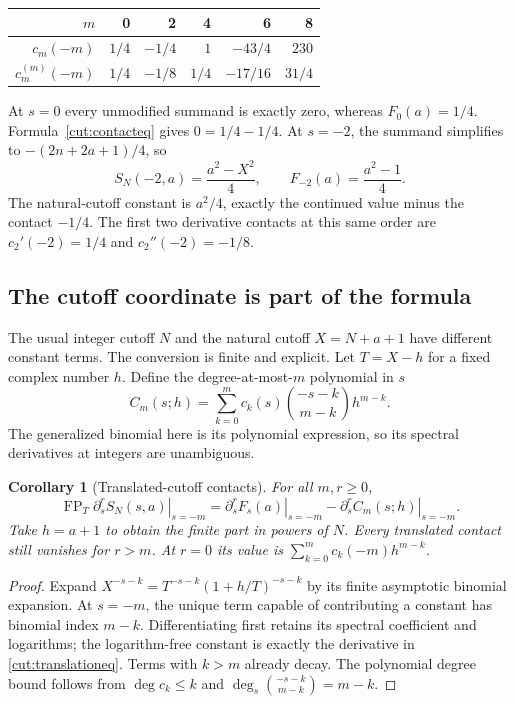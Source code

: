 \documentclass[11pt]{article}
\newtheorem{corollary}[theorem]{Corollary}
\theoremstyle{definition}
\theoremstyle{remark}
\numberwithin{equation}{section}
\newcommand{\FP}{\operatorname{FP}}
\begin{document}
\begin{center}
\begin{tabular}{@{}rrrrrr@{}}
\toprule
$m$&0&2&4&6&8\\
\midrule
$c_m(-m)$&$1/4$&$-1/4$&$1$&$-43/4$&$230$\\
$c_m^{(m)}(-m)$&$1/4$&$-1/8$&$1/4$&$-17/16$&$31/4$\\
\bottomrule
\end{tabular}
\end{center}

At $s=0$ every unmodified summand is exactly zero, whereas
$F_0(a)=1/4$. Formula~\eqref{cut:contacteq} gives $0=1/4-1/4$.
At $s=-2$, the summand simplifies to $-(2n+2a+1)/4$, so
\[
 S_N(-2,a)=\frac{a^2-X^2}{4},\qquad
 F_{-2}(a)=\frac{a^2-1}{4}.
\]
The natural-cutoff constant is $a^2/4$, exactly the continued value
minus the contact $-1/4$. The first two derivative contacts at this
same order are $c_2'(-2)=1/4$ and $c_2''(-2)=-1/8$.

\subsection{The cutoff coordinate is part of the formula}

The usual integer cutoff $N$ and the natural cutoff $X=N+a+1$ have
different constant terms. The conversion is finite and explicit.
Let $T=X-h$ for a fixed complex number $h$. Define the degree-at-most-$m$
polynomial in $s$
\begin{equation}\label{cut:translated}
 C_m(s;h)=\sum_{k=0}^{m}c_k(s)
                 \binom{-s-k}{m-k}h^{m-k}.
\end{equation}
The generalized binomial here is its polynomial expression, so its
spectral derivatives at integers are unambiguous.

\begin{corollary}[Translated-cutoff contacts]\label{cut:translation}
For all $m,r\ge0$,
\begin{equation}\label{cut:translationeq}
 \FP_T\left.\partial_s^rS_N(s,a)\right|_{s=-m}
 =\left.\partial_s^rF_s(a)\right|_{s=-m}
  -\left.\partial_s^r C_m(s;h)\right|_{s=-m}.
\end{equation}
Take $h=a+1$ to obtain the finite part in powers of $N$.
Every translated contact still vanishes for $r>m$.
At $r=0$ its value is
$\sum_{k=0}^{m}c_k(-m)h^{m-k}$.
\end{corollary}
\begin{proof}
Expand $X^{-s-k}=T^{-s-k}(1+h/T)^{-s-k}$ by its finite asymptotic
binomial expansion. At $s=-m$, the unique term capable of contributing
a constant has binomial index $m-k$. Differentiating first retains its
spectral coefficient and logarithms; the logarithm-free constant is
exactly the derivative in \eqref{cut:translationeq}. Terms with $k>m$
already decay. The polynomial degree bound follows from
$\deg c_k\le k$ and
$\deg_s\binom{-s-k}{m-k}=m-k$.
\end{proof}
\end{document}
